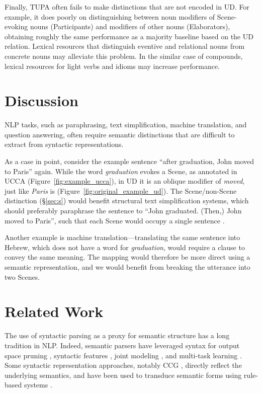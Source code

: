 \documentclass[11pt,a4paper,table]{article}
\begin{document}
Finally, TUPA often fails to make distinctions that are not encoded
in UD. For example, it does poorly on distinguishing between noun modifiers of
Scene-evoking nouns (Participants) and modifiers of other nouns (Elaborators),
obtaining roughly the same performance as 
a majority baseline based on the UD relation.
Lexical resources that distinguish eventive and relational nouns from concrete 
nouns may alleviate this problem.
In the similar case of compounds, lexical resources for light verbs and idioms may increase performance.


\section{Discussion}\label{sec:discussion}

NLP tasks, such as paraphrasing, text simplification, machine translation, and question answering,
often require semantic distinctions that are difficult to extract from syntactic representations.

As a case in point, consider the example sentence
``after graduation, John moved to Paris'' again.
While the word \textit{graduation} evokes a Scene, as annotated in UCCA
(Figure~\ref{fig:example_ucca}), in UD it is an oblique modifier of \textit{moved},
just like \textit{Paris} is (Figure~\ref{fig:original_example_ud}).
The Scene/non-Scene distinction (\S\ref{sec:s})
would benefit structural text simplification systems,
which should preferably paraphrase the sentence to
``John graduated. (Then,) John moved to Paris'',
such that each Scene would occupy a single sentence \cite{sulem2018samsa}.

Another example is machine translation---translating the same sentence into Hebrew,
which does not have a word for \textit{graduation},
would require a clause to convey the same meaning.
The mapping would therefore be more direct using a semantic representation,
and we would benefit from breaking the utterance into two Scenes.


\section{Related Work}\label{sec:related_work}

The use of syntactic parsing as a proxy for semantic structure has a long tradition in NLP.
Indeed, semantic parsers have leveraged syntax
for output space pruning \cite{xue2004calibrating}, 
syntactic features \cite{gildea2002automatic,N15-1007,E17-1045}, 
joint modeling \cite{surdeanu2008conll,hajivc2009conll}, and
multi-task learning \cite{swayamdipta2016greedy,swayamdipta2018syntactic,strubell2018linguistically}.
Some syntactic representation approaches, notably CCG \cite{Steedman:00},
directly reflect the underlying semantics, and have been used to
transduce semantic forms using rule-based systems \cite{Basile:12}.
\end{document}
